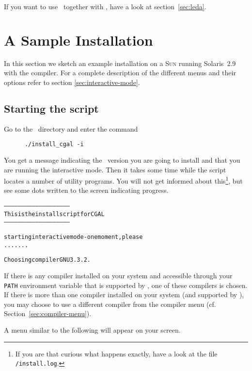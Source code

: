 If you want to use \leda\ together with \cgal, have a look at
section~\ref{sec:leda}.

\section{A Sample Installation}\label{sec:sample-inst}

In this section we sketch an example installation on a \textsc{Sun}
running Solaris~2.9 with the  compiler. For a complete
description of the different menus and their options refer to section
\ref{sec:interactive-mode}.

\subsection{Starting the script}

Go to the \cgaldir\ directory and enter the command
\begin{verbatim}
      ./install_cgal -i
\end{verbatim}

You get a message indicating the \cgal\ version you are going to
install and that you are running the interactive mode. Then it takes
some time while the script locates a number of utility programs. You
will not get informed about this\footnote{If you are that curious what
  happens exactly, have a look at the file
  \texttt{\cgaldir/install.log}.}, but see some
dots written to the screen indicating progress.

{\ccTexHtml{\scriptsize}{}
\begin{alltt}
--------------------------------------------------------
  This is the install script for CGAL \cgalrelease
--------------------------------------------------------

starting interactive mode - one moment, please
.......

  Choosing compiler GNU 3.3.2.

\end{alltt}}
  
If there is any compiler installed on your system and accessible
through your \texttt{PATH} environment variable that is supported by
\cgal, one of these compilers is chosen. If there is more than one
compiler installed on your system (and supported by \cgal), you may
choose to use a different compiler from the compiler menu (cf.
Section~\ref{sec:compiler-menu}).

A menu similar to the following will appear on your screen.

